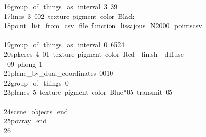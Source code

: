 \begin{tabbing}
16\>\>\>group\_of\_things\_as\_interval\ 3\ 39\ \\[0pt]
17\>\>\>lines\ 3\ 002\ texture\ pigment\ color\ Black\ \ \ \\[0pt]
18\>\>\>point\_list\_from\_csv\_file\ function\_lissajous\_N2000\_pointscsv\ \\[0pt]
\>\\[0pt]
19\>\>\>group\_of\_things\_as\_interval\ 0\ 6524\\[0pt]
20\>\>\>spheres\ 4\ 01\ texture\ pigment\ color\ Red\ \ finish\ \ diffuse\\[0pt]
\>\ 09\ phong\ 1\ \\[0pt]
21\>\>\>plane\_by\_dual\_coordinates\ 0010\ \\[0pt]
22\>\>\>group\_of\_things\ 0\ \\[0pt]
23\>\>\>planes\ 5\ texture\ pigment\ color\ Blue*05\ transmit\ 05\ \ \ \\[0pt]
\>\\[0pt]
24\>\>scene\_objects\_end\ \\[0pt]
25\>\>povray\_end\\[0pt]
26\>\end{tabbing}
